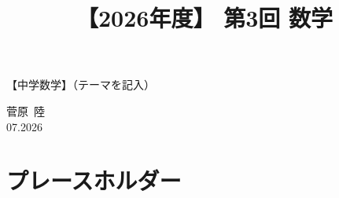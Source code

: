 \documentclass[12pt,a4paper]{jsarticle}
\title{【2026年度】 第3回 数学}                %
\author{}                     %
\date{}                       %
\begin{document}
\begin{center}
{\LARGE 【中学数学】（テーマを記入）}
\end{center}

\vspace{5mm}
\begin{flushright}
  菅原\ 陸\\[1.2em]
  07.2026
\end{flushright}


\section{プレースホルダー}



\bookletpadpages
\end{document}
